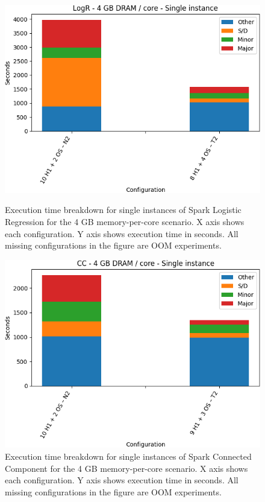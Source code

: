 \begin{figure}[thbp]
        \centering
    \includegraphics[width=\linewidth]{./fig/logr32_single.png}
    \caption{Execution time breakdown for single instances of Spark
    Logistic Regression for the 4 GB memory-per-core scenario. X axis shows each configuration. Y axis shows execution time in seconds. All missing configurations in the figure are OOM experiments.}
    \label{fig:logr32_single}

    \includegraphics[width=\linewidth]{./fig/cc32_single.png}
    \caption{Execution time breakdown for single instances of Spark
    Connected Component for the 4 GB memory-per-core scenario. X axis shows each configuration.
Y axis shows execution time in seconds. All missing configurations in the figure are OOM experiments.}
    \label{fig:cc32_single}
\end{figure}


